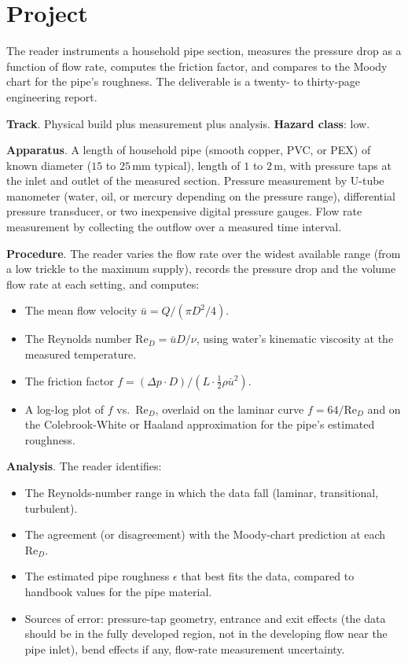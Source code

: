 \section{Project}

\begin{project}
The reader instruments a household pipe section, measures the
pressure drop as a function of flow rate, computes the friction
factor, and compares to the Moody chart for the pipe's
roughness. The deliverable is a twenty- to thirty-page engineering
report.

\textbf{Track}. Physical build plus measurement plus analysis.
\textbf{Hazard class}: low.

\textbf{Apparatus}. A length of household pipe (smooth copper,
PVC, or PEX) of known diameter ($15$ to $25\,\si{\milli\meter}$
typical), length of $1$ to $2\,\si{\meter}$, with pressure taps at
the inlet and outlet of the measured section. Pressure measurement
by U-tube manometer (water, oil, or mercury depending on the
pressure range), differential pressure transducer, or two
inexpensive digital pressure gauges. Flow rate measurement by
collecting the outflow over a measured time interval.

\textbf{Procedure}. The reader varies the flow rate over the
widest available range (from a low trickle to the maximum supply),
records the pressure drop and the volume flow rate at each
setting, and computes:

\begin{itemize}[leftmargin=*]
  \item The mean flow velocity $\bar{u} = Q/(\pi D^2/4)$.
  \item The Reynolds number $\text{Re}_D = \bar{u} D/\nu$, using
    water's kinematic viscosity at the measured temperature.
  \item The friction factor $f = (\Delta p \cdot D)/(L \cdot
    \tfrac{1}{2}\rho \bar{u}^2)$.
  \item A log-log plot of $f$ vs.\ $\text{Re}_D$, overlaid on the
    laminar curve $f = 64/\text{Re}_D$ and on the Colebrook-White
    or Haaland approximation for the pipe's estimated roughness.
\end{itemize}

\textbf{Analysis}. The reader identifies:

\begin{itemize}[leftmargin=*]
  \item The Reynolds-number range in which the data fall (laminar,
    transitional, turbulent).
  \item The agreement (or disagreement) with the Moody-chart
    prediction at each $\text{Re}_D$.
  \item The estimated pipe roughness $\epsilon$ that best fits the
    data, compared to handbook values for the pipe material.
  \item Sources of error: pressure-tap geometry, entrance and exit
    effects (the data should be in the fully developed region,
    not in the developing flow near the pipe inlet), bend effects
    if any, flow-rate measurement uncertainty.
\end{itemize}


\end{project}
